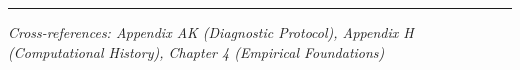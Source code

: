 \vspace{1em}
\hrule
\vspace{0.5em}
\noindent\textit{Cross-references: Appendix AK (Diagnostic Protocol), 
Appendix H (Computational History), Chapter 4 (Empirical Foundations)}

% 
%
%
%
%
%
%
%
